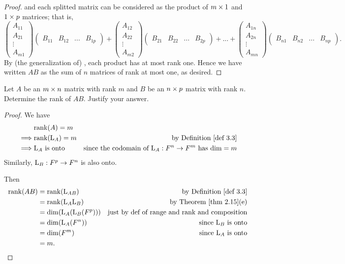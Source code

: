 \begin{proof}
and each splitted matrix can be considered as the product of \(m \times 1\) and \(1 \times p\) matrices;
that is,
\[
    \begin{pmatrix} A_{11} \\ A_{21} \\ \vdots \\ A_{m1} \end{pmatrix} \begin{pmatrix} B_{11} & B_{12} & ... & B_{1p} \end{pmatrix}
    + \begin{pmatrix} A_{12} \\ A_{22} \\ \vdots \\ A_{m2} \end{pmatrix} \begin{pmatrix} B_{21} & B_{22} & ... & B_{2p} \end{pmatrix}
    + ... + \begin{pmatrix} A_{1n} \\ A_{2n} \\ \vdots \\ A_{mn} \end{pmatrix} \begin{pmatrix} B_{n1} & B_{n2} & ... & B_{np} \end{pmatrix}.
\]
By (the generalization of) , each product has at most rank one.
Hence we have written \(AB\) as the sum of \(n\) matrices of rank at most one, as desired.
\end{proof}

\begin{exercise} \label{exercise 3.2.19}
Let \(A\) be an \(m \times n\) matrix with rank \(m\) and \(B\) be an \(n \times p\) matrix with rank \(n\).
Determine the rank of \(AB\).
Justify your answer.
\end{exercise}

\begin{proof}
We have
\begin{align*}
             & \rank(A) = m \\
    \implies & \rank(\LMTRAN_A) = m & \text{by \DEF{3.3}} \\
    \implies & \LMTRAN_A \text{ is onto } & \text{since the codomain of \(\LMTRAN_A : F^n \to F^m\) has \(\dim = m\)}
\end{align*}
Similarly, \(\mathrm{L}_B: F^p \to F^n\) is also onto.

Then
\begin{align*}
    \rank(AB) & = \rank(\LMTRAN_{AB}) & \text{by \DEF{3.3}} \\
              & = \rank(\LMTRAN_A \LMTRAN_B) & \text{by \THM{2.15}(e)} \\
              & = \dim(\LMTRAN_A(\LMTRAN_B(F^p))) & \text{just by def of range and rank and composition} \\
              & = \dim(\LMTRAN_A(F^n)) & \text{since \(\LMTRAN_B\) is onto} \\
              & = \dim(F^m) & \text{since \(\LMTRAN_A\) is onto} \\
              & = m.
\end{align*}
\end{proof}

